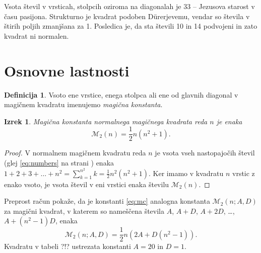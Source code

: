 \documentclass[a4paper,12pt]{article}
\newcommand{\m}{\mathcal{M}_2}
\theoremstyle{definition}
\newtheorem{definicija}{Definicija}
\theoremstyle{plain}
\newtheorem{izrek}{Izrek}
\begin{document}
Vsota števil v vrsticah, stolpcih oziroma na diagonalah je 33 -- Jezusova starost
v času pasijona. Strukturno je kvadrat podoben Dürerjevemu, vendar so števila
v štirih poljih zmanjšana za 1. Posledica je, da sta števili 10 in 14 podvojeni
in zato kvadrat ni normalen.
%



\section{Osnovne lastnosti}

\begin{definicija}
   Vsoto ene vrstice, enega stolpca ali ene od glavnih diagonal
   v magičnem kvadratu imenujemo \emph{magična konstanta}.
\end{definicija}


\begin{izrek}
   Magična konstanta normalnega magičnega kvadrata reda \(n\)
   je enaka
   \begin{equation}
      \label{eq:mc}
      \m(n) = \frac{1}{2} n(n^2+1).
   \end{equation}
\end{izrek}

\begin{proof}
   V normalnem magičnem kvadratu reda \(n\) je vsota vseh nastopajočih
   števil (glej \eqref{eq:numbers} na strani \pageref{eq:numbers}) enaka
   \(1+2+3+\ldots+n^2=\sum_{k=1}^{n^2}k=\frac{1}{2}n^2(n^2+1)\). Ker imamo
   v kvadratu \(n\) vrstic z enako vsoto, je vsota števil v eni vrstici
   enaka številu \(\m(n)\).
\end{proof}

Preprost račun pokaže, da je konstanti \eqref{eq:mc} analogna konstanta
\(\m(n;A,D)\) za magični kvadrat, v katerem so nameščena števila
\(A\), \(A+D\), \(A+2D\), \ldots, \(A+(n^2-1)D\), enaka
\[
   \m(n;A,D) = \frac{1}{2} n \left(2A+D(n^2-1)\right).
\]
Kvadratu v tabeli ?!? ustrezata konstanti \(A=20\) in \(D=1\). %
\end{document}
